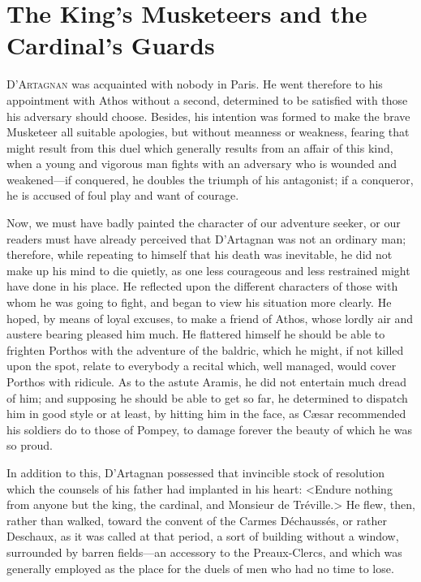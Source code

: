 
\chapter{The King's Musketeers and the Cardinal's Guards} 
	
\lettrine{D}{'Artagnan} was acquainted with nobody in Paris. He went therefore to his appointment with Athos without a second, determined to be satisfied with those his adversary should choose. Besides, his intention was formed to make the brave Musketeer all suitable apologies, but without meanness or weakness, fearing that might result from this duel which generally results from an affair of this kind, when a young and vigorous man fights with an adversary who is wounded and weakened—if conquered, he doubles the triumph of his antagonist; if a conqueror, he is accused of foul play and want of courage. 

Now, we must have badly painted the character of our adventure seeker, or our readers must have already perceived that D'Artagnan was not an ordinary man; therefore, while repeating to himself that his death was inevitable, he did not make up his mind to die quietly, as one less courageous and less restrained might have done in his place. He reflected upon the different characters of those with whom he was going to fight, and began to view his situation more clearly. He hoped, by means of loyal excuses, to make a friend of Athos, whose lordly air and austere bearing pleased him much. He flattered himself he should be able to frighten Porthos with the adventure of the baldric, which he might, if not killed upon the spot, relate to everybody a recital which, well managed, would cover Porthos with ridicule. As to the astute Aramis, he did not entertain much dread of him; and supposing he should be able to get so far, he determined to dispatch him in good style or at least, by hitting him in the face, as Cæsar recommended his soldiers do to those of Pompey, to damage forever the beauty of which he was so proud. 

In addition to this, D'Artagnan possessed that invincible stock of resolution which the counsels of his father had implanted in his heart: <Endure nothing from anyone but the king, the cardinal, and Monsieur de Tréville.> He flew, then, rather than walked, toward the convent of the Carmes Déchaussés, or rather Deschaux, as it was called at that period, a sort of building without a window, surrounded by barren fields—an accessory to the Preaux-Clercs, and which was generally employed as the place for the duels of men who had no time to lose. 

